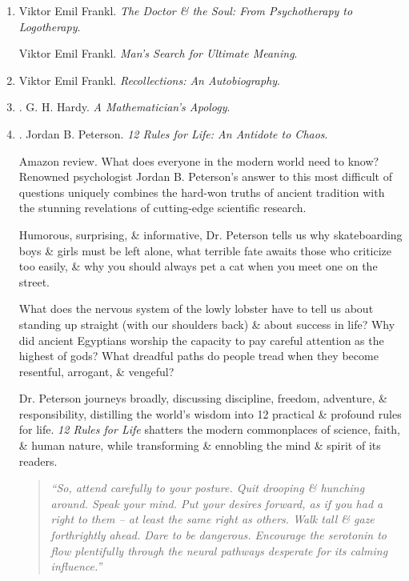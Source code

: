 \documentclass{article}
\begin{document}
\begin{enumerate}
	\item {\sc Viktor Emil Frankl}. {\it The Doctor \& the Soul: From Psychotherapy to Logotherapy}.

	{\sc Viktor Emil Frankl}. {\it Man's Search for Ultimate Meaning}.

	\item {\sc Viktor Emil Frankl}. {\it Recollections: An Autobiography}.

	\item \cite{Hardy1940,Hardy1992,Hardy2022}. {\sc G. H. Hardy}. {\it A Mathematician's Apology}.\hfill{\sf[done]}

	\item \cite{Peterson_rule}. {\sc Jordan B. Peterson}. {\it12 Rules for Life: An Antidote to Chaos}.{}\hfill{\sf[reading]}

	{\sf Amazon review.} What does everyone in the modern world need to know? Renowned psychologist {\sc Jordan B. Peterson}'s answer to this most difficult of questions uniquely combines the hard-won truths of ancient tradition with the stunning revelations of cutting-edge scientific research.

	Humorous, surprising, \& informative, Dr. {\sc Peterson} tells us why skateboarding boys \& girls must be left alone, what terrible fate awaits those who criticize too easily, \& why you should always pet a cat when you meet one on the street.

	What does the nervous system of the lowly lobster have to tell us about standing up straight (with our shoulders back) \& about success in life? Why did ancient Egyptians worship the capacity to pay careful attention as the highest of gods? What dreadful paths do people tread when they become resentful, arrogant, \& vengeful?

	Dr. {\sc Peterson} journeys broadly, discussing discipline, freedom, adventure, \& responsibility, distilling the world's wisdom into 12 practical \& profound rules for life. {\it12 Rules for Life} shatters the modern commonplaces of science, faith, \& human nature, while transforming \& ennobling the mind \& spirit of its readers.

	\begin{quotation}
		{\it``So, attend carefully to your posture. Quit drooping \& hunching around. Speak your mind. Put your desires forward, as if you had a right to them -- at least the same right as others. Walk tall \& gaze forthrightly ahead. Dare to be dangerous. Encourage the serotonin to flow plentifully through the neural pathways desperate for its calming influence.''}


\end{quotation}
\end{enumerate}
\end{document}
